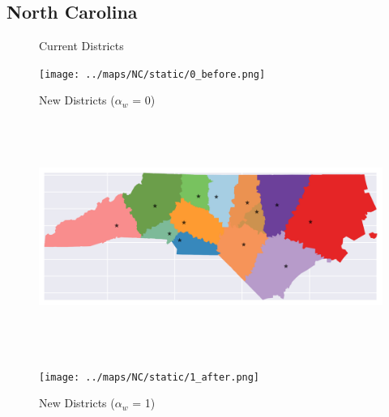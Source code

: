 \subsection{North Carolina}
\begin{figure}[htb!] \centering
\caption{ Current Districts }
\texttt{[image: ../maps/NC/static/0\_before.png]}
\caption{ New Districts ($\alpha_w$ = 0) }
\includegraphics[width=5in,height=3in,keepaspectratio]{../maps/NC/static/0_after.png}
\caption{ New Districts ($\alpha_w$ = 1) }
\texttt{[image: ../maps/NC/static/1\_after.png]}
\end{figure}

\clearpage
\newpage

